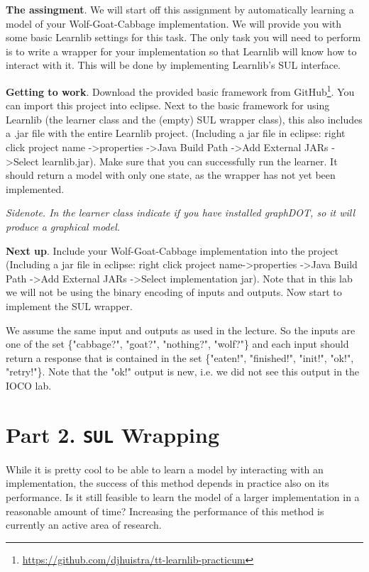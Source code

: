 \documentclass[a4paper]{article}
\begin{document}
\textbf{The assingment}. We will start off this assignment by automatically learning a model of your Wolf-Goat-Cabbage implementation. We will provide you with some basic Learnlib settings for this task. The only task you will need to perform is to write a wrapper for your implementation so that Learnlib will know how to interact with it.  This will be done by implementing Learnlib's SUL interface.

\textbf{Getting to work}. Download the provided basic framework from GitHub\footnote{\url{https://github.com/djhuistra/tt-learnlib-practicum}}. You can import this project into eclipse. Next to the basic framework for using Learnlib (the learner class and the (empty) SUL wrapper class), this also includes a .jar file with the entire Learnlib project. (Including a jar file in eclipse: right click project name  -\textgreater properties  -\textgreater Java Build Path -\textgreater Add External JARs -\textgreater Select learnlib.jar). Make sure that you can successfully run the learner. It should return a model with only one state, as the wrapper has not yet been implemented.

\emph{Sidenote. In the learner class indicate if you have installed graphDOT, so it will produce a graphical model.}

\textbf{Next up}. Include your Wolf-Goat-Cabbage implementation into the project (Including a jar file in eclipse: right click project name-\textgreater properties  -\textgreater Java Build Path  -\textgreater  Add External JARs  -\textgreater  Select implementation jar). Note that in this lab we will not be using the binary encoding of inputs and outputs. Now start to implement the SUL wrapper.

We assume the same input and outputs as used in the lecture. So the inputs are one of the set \{"cabbage?", "goat?", "nothing?", "wolf?"\} and each input should return a response that is contained in the set \{"eaten!", "finished!", "init!", "ok!", "retry!"\}. Note that the "ok!" output is new, i.e. we did not see this output in the IOCO lab.

\section*{Part 2. \texttt{SUL} Wrapping}


While it is pretty cool to be able to learn a model by interacting with an implementation, the success of this method depends in practice also on its performance. Is it still feasible to learn the model of a larger implementation in a reasonable amount of time? Increasing the performance of this method is currently an active area of research.
\end{document}
